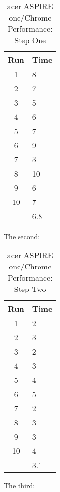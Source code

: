 \begin{table}
  \begin{tabular}{| c | l |}
    \hline
    Run  & Time \\ \hline
    1    & 8    \\ \hline
    2    & 7    \\ \hline
    3    & 5    \\ \hline
    4    & 6    \\ \hline
    5    & 7    \\ \hline
    6    & 9    \\ \hline
    7    & 3    \\ \hline
    8    & 10   \\ \hline
    9    & 6    \\ \hline
    10   & 7    \\ \hline
    & 6.8  \\
    \hline
  \end{tabular}
  \caption{acer ASPIRE one/Chrome Performance: Step One}
  \label{aspChrPerf01}
\end{table}

The second:

\begin{table}
  \begin{tabular}{| c | l |}
    \hline
    Run  & Time \\ \hline
    1    & 2    \\ \hline
    2    & 3    \\ \hline
    3    & 2    \\ \hline
    4    & 3    \\ \hline
    5    & 4    \\ \hline
    6    & 5    \\ \hline
    7    & 2    \\ \hline
    8    & 3    \\ \hline
    9    & 3    \\ \hline
    10   & 4    \\ \hline
    & 3.1  \\
    \hline
  \end{tabular}
  \caption{acer ASPIRE one/Chrome Performance: Step Two}
  \label{aspChrPerf02}
\end{table}

The third:

